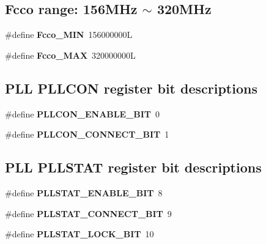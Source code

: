 \subsection*{Fcco range\+: 156M\+Hz $\sim$ 320M\+Hz}
\begin{DoxyCompactItemize}
\item 
\mbox{\label{group__RTEMSBSPsARMRTL22XX_ga53746ea46e84205fcd8afa0e7c15f8e7}} 
\#define {\bfseries Fcco\+\_\+\+M\+IN}~156000000L
\item 
\mbox{\label{group__RTEMSBSPsARMRTL22XX_gac8e51ae1a762be48ad7915b993fd74ac}} 
\#define {\bfseries Fcco\+\_\+\+M\+AX}~320000000L
\end{DoxyCompactItemize}
\subsection*{P\+LL P\+L\+L\+C\+ON register bit descriptions}
\begin{DoxyCompactItemize}
\item 
\mbox{\label{group__RTEMSBSPsARMRTL22XX_ga877dbfc7d01bbc9a510ccf7351aaea04}} 
\#define {\bfseries P\+L\+L\+C\+O\+N\+\_\+\+E\+N\+A\+B\+L\+E\+\_\+\+B\+IT}~0
\item 
\mbox{\label{group__RTEMSBSPsARMRTL22XX_ga90444d5f33dd5565d3a32fd37adc4ad5}} 
\#define {\bfseries P\+L\+L\+C\+O\+N\+\_\+\+C\+O\+N\+N\+E\+C\+T\+\_\+\+B\+IT}~1
\end{DoxyCompactItemize}
\subsection*{P\+LL P\+L\+L\+S\+T\+AT register bit descriptions}
\begin{DoxyCompactItemize}
\item 
\mbox{\label{group__RTEMSBSPsARMRTL22XX_gab522cacddd48b4d8231d104ac384bd07}} 
\#define {\bfseries P\+L\+L\+S\+T\+A\+T\+\_\+\+E\+N\+A\+B\+L\+E\+\_\+\+B\+IT}~8
\item 
\mbox{\label{group__RTEMSBSPsARMRTL22XX_ga004bb83f6cf523cb72ac4aa02ad7c05f}} 
\#define {\bfseries P\+L\+L\+S\+T\+A\+T\+\_\+\+C\+O\+N\+N\+E\+C\+T\+\_\+\+B\+IT}~9
\item 
\mbox{\label{group__RTEMSBSPsARMRTL22XX_gab055983e8f5879a7bf2acf6b82daad92}} 
\#define {\bfseries P\+L\+L\+S\+T\+A\+T\+\_\+\+L\+O\+C\+K\+\_\+\+B\+IT}~10
\end{DoxyCompactItemize}
